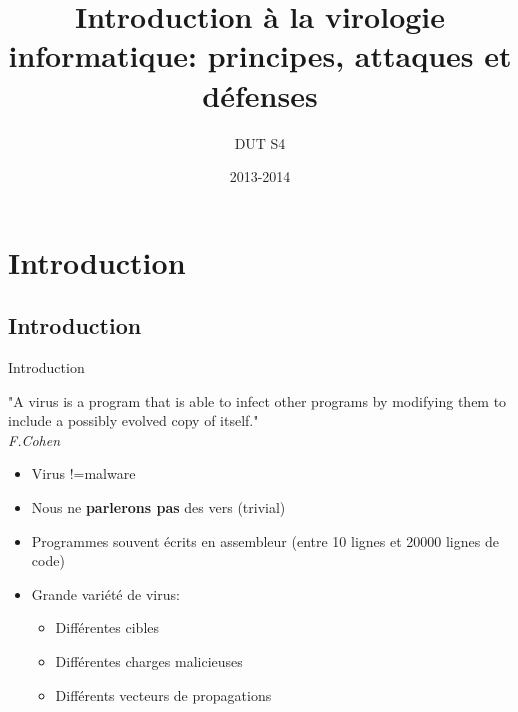 \documentclass{beamer}
\title[Introduction  la sécurité informatique]{Introduction à la virologie informatique: principes, attaques et défenses}
\institute{\textbf{Pierre Ramet:} \texttt{ramet@labri.fr}}
\author{DUT S4}
\date{2013-2014}
\begin{document}
\begin{frame}

  \titlepage

\end{frame}


\section{Introduction}
\subsection{Introduction}

\begin{frame}{Introduction}

\begin{definition}
"A virus is a program that is able to infect other programs by modifying them to include a possibly evolved copy of itself." \\
\hfill \textit{F.Cohen}
\end{definition}
\begin{itemize}
\item Virus !=malware
\item Nous ne \textbf{parlerons pas} des vers (trivial)
\item Programmes souvent écrits en assembleur (entre 10 lignes et 20000 lignes de code)
\item Grande variété de virus:
\begin{itemize}
\item Différentes cibles
\item Différentes charges malicieuses
\item Différents vecteurs de propagations
\end{itemize}
\end{itemize}
\end{frame}
\end{document}
